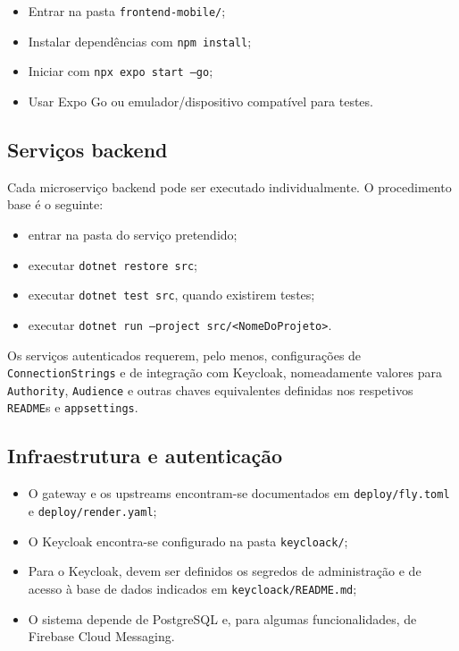 \documentclass[a4paper,11pt]{article}
\begin{document}
\begin{itemize}[leftmargin=1.8em]
    \item Entrar na pasta \texttt{frontend-mobile/};
    \item Instalar depend\^encias com \texttt{npm install};
    \item Iniciar com \texttt{npx expo start --go};
    \item Usar Expo Go ou emulador/dispositivo compat\'ivel para testes.
\end{itemize}

\subsection{Servi\c{c}os backend}

Cada microservi\c{c}o backend pode ser executado individualmente. O procedimento base \'e o seguinte:

\begin{itemize}[leftmargin=1.8em]
    \item entrar na pasta do servi\c{c}o pretendido;
    \item executar \texttt{dotnet restore src};
    \item executar \texttt{dotnet test src}, quando existirem testes;
    \item executar \texttt{dotnet run --project src/<NomeDoProjeto>}.
\end{itemize}

Os servi\c{c}os autenticados requerem, pelo menos, configura\c{c}\~oes de \texttt{ConnectionStrings} e de integra\c{c}\~ao com Keycloak, nomeadamente valores para \texttt{Authority}, \texttt{Audience} e outras chaves equivalentes definidas nos respetivos \texttt{README}s e \texttt{appsettings}.

\subsection{Infraestrutura e autentica\c{c}\~ao}

\begin{itemize}[leftmargin=1.8em]
    \item O gateway e os upstreams encontram-se documentados em \texttt{deploy/fly.toml} e \texttt{deploy/render.yaml};
    \item O Keycloak encontra-se configurado na pasta \texttt{keycloack/};
    \item Para o Keycloak, devem ser definidos os segredos de administra\c{c}\~ao e de acesso \`a base de dados indicados em \texttt{keycloack/README.md};
    \item O sistema depende de PostgreSQL e, para algumas funcionalidades, de Firebase Cloud Messaging.
\end{itemize}
\end{document}
